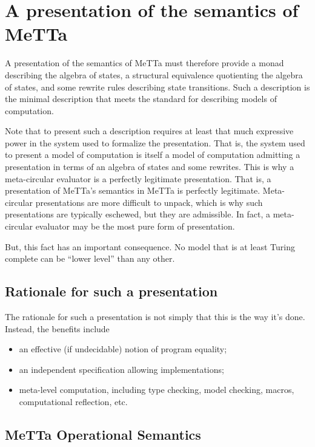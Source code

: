 \section{A presentation of the semantics of MeTTa}

A presentation of the semantics of MeTTa must therefore provide a monad describing the algebra of states, a structural equivalence quotienting the algebra of states, and some rewrite rules describing state transitions. Such a description is the minimal description that meets the standard for describing models of computation. 

Note that to present such a description requires at least that much expressive power in the system used to formalize the presentation. That is, the system used to present a model of computation is itself a model of computation admitting a presentation in terms of an algebra of states and some rewrites. This is why a meta-circular evaluator is a perfectly legitimate presentation. That is, a presentation of MeTTa’s semantics in MeTTa is perfectly legitimate. Meta-circular presentations are more difficult to unpack, which is why such presentations are typically eschewed, but they are admissible. In fact, a meta-circular evaluator may be the most pure form of presentation.

But, this fact has an important consequence. No model that is at least Turing complete can be “lower level” than any other.

\subsection{Rationale for such a presentation}

The rationale for such a presentation is not simply that this is the way it’s done. Instead, the benefits include

\begin{itemize}
  \item an effective (if undecidable) notion of program equality;
  \item an independent specification allowing implementations;
  \item meta-level computation, including type checking, model checking, macros, computational reflection, etc.
\end{itemize}

\subsection{MeTTa Operational Semantics}

